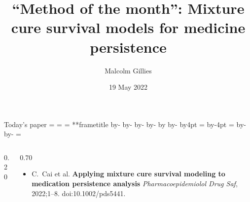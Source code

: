 \documentclass[aspectratio=169,12pt]{beamer} %
\title{``Method of the month'': Mixture cure survival models for medicine persistence}
\author{Malcolm Gillies}
\date{19 May 2022}
\makeatletter
\newif\ifsidebartheme
\newcommand*{\calculatespace}{%
    \contentheight=\paperheight%
    \ifx\beamer@frametitle\@empty%
        \setbox\@tempboxa=\box\voidb@x%
      \else%
        \setbox\@tempboxa=\vbox{%
          \vbox{}%
          {\parskip0pt\usebeamertemplate***{frametitle}}%
        }%
        \ifsidebartheme%
          \advance\contentheight by-1em%
        \fi%
      \fi%
    \advance\contentheight by-\ht\@tempboxa%
    \advance\contentheight by-\dp\@tempboxa%
    \advance\contentheight by-\beamer@frametopskip%
    \ifbeamer@plainframe%
    \contentbottom=0pt%
    \else%
    \advance\contentheight by-\headheight%
    \advance\contentheight by\headdp%
    \advance\contentheight by-\footheight%
    \advance\contentheight by4pt%
    \contentbottom=\footheight%
    \advance\contentbottom by-4pt%
    \fi%
    \contentwidth=\paperwidth%
    \ifbeamer@plainframe%
    \contentleft=0pt%
    \else%
    \advance\contentwidth by-\beamer@rightsidebar%
    \advance\contentwidth by-\beamer@leftsidebar\relax%
    \contentleft=\beamer@leftsidebar%
    \fi%
}
\makeatother
\begin{document}
{
\begin{frame}
\titlepage
\end{frame}
}

\begin{frame}{Today's paper}
\calculatespace%
\begin{columns}
\begin{column}{0.20\contentwidth}
\end{column}
\begin{column}{0.70\contentwidth}
	\begin{itemize}
		\item C.~Cai et al. \textbf{Applying mixture cure survival modeling to medication persistence analysis} \emph{Pharmacoepidemiolol Drug Saf}, 2022;1--8. doi:10.1002/pds5441.
\nocite{cai_applying_2022}
	\end{itemize}
\end{column}
\end{columns}
\end{frame}
\end{document}
